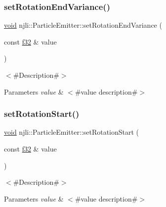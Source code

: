\subsubsection{\texorpdfstring{set\+Rotation\+End\+Variance()}{setRotationEndVariance()}}
{\footnotesize\ttfamily \mbox{\hyperlink{_thread_8h_af1e856da2e658414cb2456cb6f7ebc66}{void}} njli\+::\+Particle\+Emitter\+::set\+Rotation\+End\+Variance (\begin{DoxyParamCaption}\item[{const \mbox{\hyperlink{_util_8h_a5f6906312a689f27d70e9d086649d3fd}{f32}} \&}]{value }\end{DoxyParamCaption})}

$<$\#\+Description\#$>$


\begin{DoxyParams}{Parameters}
{\em value} & $<$\#value description\#$>$ \\
\hline
\end{DoxyParams}
\mbox{\label{classnjli_1_1_particle_emitter_ae8be818dc4b9f989420d38d00d5c53ba}} 
\subsubsection{\texorpdfstring{set\+Rotation\+Start()}{setRotationStart()}}
{\footnotesize\ttfamily \mbox{\hyperlink{_thread_8h_af1e856da2e658414cb2456cb6f7ebc66}{void}} njli\+::\+Particle\+Emitter\+::set\+Rotation\+Start (\begin{DoxyParamCaption}\item[{const \mbox{\hyperlink{_util_8h_a5f6906312a689f27d70e9d086649d3fd}{f32}} \&}]{value }\end{DoxyParamCaption})}

$<$\#\+Description\#$>$


\begin{DoxyParams}{Parameters}
{\em value} & $<$\#value description\#$>$ \\
\hline
\end{DoxyParams}
\mbox{\label{classnjli_1_1_particle_emitter_a06b9db945d2562c5878574cd594e79f8}} 
